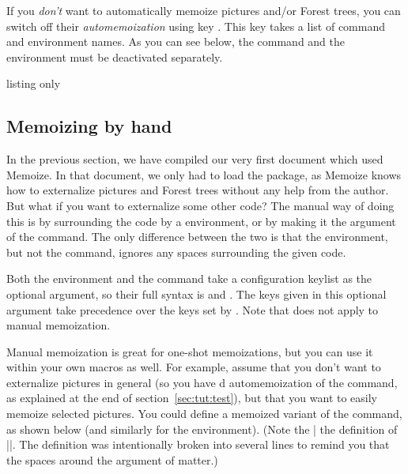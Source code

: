 \documentclass[a4paper,11pt]{article}
\begin{document}
If you \emph{don't} want to automatically memoize \TikZ pictures and/or Forest
trees, you can switch off their \emph{automemoization} using key
.  This key takes a list of command and environment
names.  As you can see below, the command and the environment must be
deactivated separately.

\begin{tcblisting}{listing only}
\end{tcblisting}


\subsection{Memoizing by hand}
\label{sec:tut:memoize}

In the previous section, we have compiled our very first document which used
Memoize.  In that document, we only had to load the package, as Memoize knows
how to externalize \TikZ pictures and Forest trees without any help from the
author.  But what if you want to externalize some other code?  The manual way of
doing this is by surrounding the code by a  environment,
or by making it the argument of the  command.  The only
difference between the two is that the environment, but not the command,
ignores any spaces surrounding the given code.


Both the  environment and the  command take a
configuration keylist as the optional argument, so their full syntax is
 and
.  The keys given in
this optional argument take precedence over the keys set by .
Note that  does not apply to manual memoization.

Manual memoization is great for one-shot memoizations, but you can use it
within your own macros as well.  For example, assume that you don't want to
externalize \TikZ pictures in general (so you have d
automemoization of the  command, as explained at the end of
section~\ref{sec:tut:test}), but that you want to easily memoize selected
pictures.  You could define a memoized variant of the  command, as shown
below (and similarly for the environment).  (Note the |%
the definition of |\mmztikz|.  The definition was intentionally broken into
several lines to remind you that the spaces around the argument of 
matter.)
\end{document}
